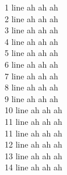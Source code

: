 \documentclass{ximera}
\begin{document}
1 line ah ah ah \\
2 line ah ah ah \\
3 line ah ah ah \\
4 line ah ah ah \\
5 line ah ah ah \\
6 line ah ah ah \\
7 line ah ah ah \\
8 line ah ah ah \\
9 line ah ah ah \\
10 line ah ah ah \\
11 line ah ah ah \\
11 line ah ah ah \\
12 line ah ah ah \\
13 line ah ah ah \\
14 line ah ah ah \\
\end{document}
